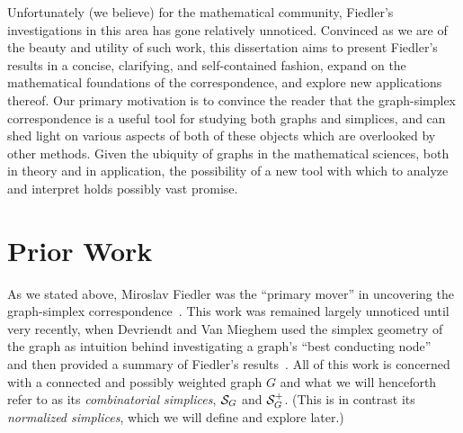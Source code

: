 Unfortunately (we believe) for  the mathematical community,  Fiedler's investigations in this area  has  gone relatively unnoticed. Convinced as we are of  the beauty and  utility of such  work, this dissertation aims to present Fiedler's  results in a concise, clarifying, and self-contained fashion,  expand on the mathematical  foundations of the correspondence, and explore new applications thereof. Our primary motivation is to convince the reader that the graph-simplex correspondence is a  useful tool for studying both graphs and simplices,  and  can shed light on various  aspects of both of these objects which are  overlooked by other  methods. Given the ubiquity of graphs in the mathematical  sciences, both in theory and in application, the possibility of a new tool with which to analyze and interpret holds possibly vast promise. 



\section{Prior Work}
\label{sec:intro_prior_work}


As we stated  above, Miroslav Fiedler was the ``primary  mover''  in  uncovering the graph-simplex correspondence~\cite{fiedler1993geometric,fiedler2005geometry,fiedler2011matrices}.  This work was remained largely unnoticed until very recently, when Devriendt and Van Mieghem used the simplex geometry of the graph as intuition behind investigating  a graph's ``best conducting node''~\cite{van2017pseudoinverse} and  then provided a summary  of Fiedler's results~\cite{devriendt2018simplex}. All of this work is concerned  with a connected and possibly  weighted graph $G$ and what we will henceforth  refer to as its  \emph{combinatorial simplices}, $\mathcal{S}_G$ and $\mathcal{S}_G^+$. (This is in contrast its \emph{normalized simplices}, which we  will define and explore later.) 

